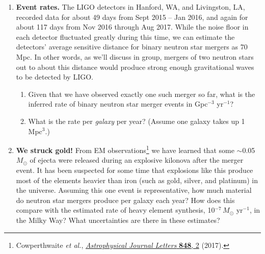 \documentclass[11pt]{article}
\begin{document}
\begin{enumerate}
\item \textbf{Event rates.} The LIGO detectors in Hanford, WA, and Livingston, LA, recorded data for about 49 days from Sept 2015 -- Jan 2016,
and again for about 117 days from Nov 2016 through Aug 2017. While the noise floor in each detector fluctuated greatly during this time, we can
estimate the detectors' average sensitive distance for binary neutron star mergers as 70 Mpc. In other words, as we'll discuss in group, mergers
of two neutron stars out to about this distance would produce strong enough gravitational waves to be detected by LIGO.

\begin{enumerate}
\item Given that we have observed exactly one such merger so far, what is the inferred rate of binary neutron star merger events in Gpc$^{-3}$
yr$^{-1}$?

\item What is the rate per \emph{galaxy} per year? (Assume one galaxy takes up 1 Mpc$^3$.)
\end{enumerate}

\item \textbf{We struck gold!} From EM observations\footnote{Cowperthwaite \textit{et al.},
\href{http://iopscience.iop.org/article/10.3847/2041-8213/aa8fc7}{\textit{Astrophysical Journal Letters} \textbf{848}, 2} (2017).} we have learned
that some $\sim$0.05\,$M_{\odot}$ of ejecta were released during an explosive kilonova after the merger event. It has been suspected for some time
that explosions like this produce most of the elements heavier than iron (such as gold, silver, and platinum) in the universe. Assuming this one
event is representative, how much material do neutron star mergers produce per galaxy each year? How does this compare with the estimated rate of
heavy element synthesis, 10$^{-\text{7}}$\,$M_{\odot}$ yr$^{-1}$, in the Milky Way? What uncertainties are there in these estimates?

\end{enumerate}
\end{document}
